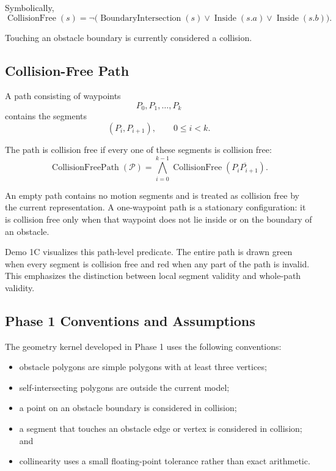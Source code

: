 Symbolically,
\[
\operatorname{CollisionFree}(s)
=\neg\bigl(
\operatorname{BoundaryIntersection}(s)
\lor \operatorname{Inside}(s.a)
\lor \operatorname{Inside}(s.b)
\bigr).
\]

Touching an obstacle boundary is currently considered a collision.

\subsection{Collision-Free Path}

A path consisting of waypoints
\[
P_0,P_1,\ldots,P_k
\]
contains the segments
\[
(P_i,P_{i+1}), \qquad 0\leq i<k.
\]

The path is collision free if every one of these segments is collision free:
\[
\operatorname{CollisionFreePath}(\mathcal{P})
=\bigwedge_{i=0}^{k-1}
\operatorname{CollisionFree}\!\left(\overline{P_iP_{i+1}}\right).
\]

An empty path contains no motion segments and is treated as collision free by
the current representation. A one-waypoint path is a stationary configuration:
it is collision free only when that waypoint does not lie inside or on the
boundary of an obstacle.

Demo 1C visualizes this path-level predicate. The entire path is drawn green
when every segment is collision free and red when any part of the path is
invalid. This emphasizes the distinction between local segment validity and
whole-path validity.

\subsection{Phase 1 Conventions and Assumptions}

The geometry kernel developed in Phase 1 uses the following conventions:
\begin{itemize}
    \item obstacle polygons are simple polygons with at least three vertices;
    \item self-intersecting polygons are outside the current model;
    \item a point on an obstacle boundary is considered in collision;
    \item a segment that touches an obstacle edge or vertex is considered in
    collision; and
    \item collinearity uses a small floating-point tolerance rather than exact
    arithmetic.
\end{itemize}

